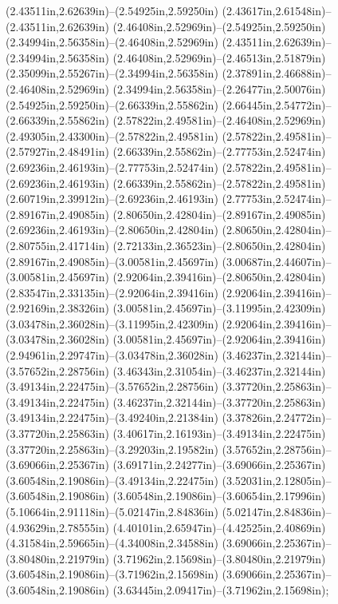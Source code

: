 (2.43511in,2.62639in)--(2.54925in,2.59250in) (2.43617in,2.61548in)--(2.43511in,2.62639in) (2.46408in,2.52969in)--(2.54925in,2.59250in) (2.34994in,2.56358in)--(2.46408in,2.52969in) (2.43511in,2.62639in)--(2.34994in,2.56358in) (2.46408in,2.52969in)--(2.46513in,2.51879in) (2.35099in,2.55267in)--(2.34994in,2.56358in) (2.37891in,2.46688in)--(2.46408in,2.52969in) (2.34994in,2.56358in)--(2.26477in,2.50076in) (2.54925in,2.59250in)--(2.66339in,2.55862in) (2.66445in,2.54772in)--(2.66339in,2.55862in) (2.57822in,2.49581in)--(2.46408in,2.52969in) (2.49305in,2.43300in)--(2.57822in,2.49581in) (2.57822in,2.49581in)--(2.57927in,2.48491in) (2.66339in,2.55862in)--(2.77753in,2.52474in) (2.69236in,2.46193in)--(2.77753in,2.52474in) (2.57822in,2.49581in)--(2.69236in,2.46193in) (2.66339in,2.55862in)--(2.57822in,2.49581in) (2.60719in,2.39912in)--(2.69236in,2.46193in) (2.77753in,2.52474in)--(2.89167in,2.49085in) (2.80650in,2.42804in)--(2.89167in,2.49085in) (2.69236in,2.46193in)--(2.80650in,2.42804in) (2.80650in,2.42804in)--(2.80755in,2.41714in) (2.72133in,2.36523in)--(2.80650in,2.42804in) (2.89167in,2.49085in)--(3.00581in,2.45697in) (3.00687in,2.44607in)--(3.00581in,2.45697in) (2.92064in,2.39416in)--(2.80650in,2.42804in) (2.83547in,2.33135in)--(2.92064in,2.39416in) (2.92064in,2.39416in)--(2.92169in,2.38326in) (3.00581in,2.45697in)--(3.11995in,2.42309in) (3.03478in,2.36028in)--(3.11995in,2.42309in) (2.92064in,2.39416in)--(3.03478in,2.36028in) (3.00581in,2.45697in)--(2.92064in,2.39416in) (2.94961in,2.29747in)--(3.03478in,2.36028in) (3.46237in,2.32144in)--(3.57652in,2.28756in) (3.46343in,2.31054in)--(3.46237in,2.32144in) (3.49134in,2.22475in)--(3.57652in,2.28756in) (3.37720in,2.25863in)--(3.49134in,2.22475in) (3.46237in,2.32144in)--(3.37720in,2.25863in) (3.49134in,2.22475in)--(3.49240in,2.21384in) (3.37826in,2.24772in)--(3.37720in,2.25863in) (3.40617in,2.16193in)--(3.49134in,2.22475in) (3.37720in,2.25863in)--(3.29203in,2.19582in) (3.57652in,2.28756in)--(3.69066in,2.25367in) (3.69171in,2.24277in)--(3.69066in,2.25367in) (3.60548in,2.19086in)--(3.49134in,2.22475in) (3.52031in,2.12805in)--(3.60548in,2.19086in) (3.60548in,2.19086in)--(3.60654in,2.17996in) (5.10664in,2.91118in)--(5.02147in,2.84836in) (5.02147in,2.84836in)--(4.93629in,2.78555in) (4.40101in,2.65947in)--(4.42525in,2.40869in) (4.31584in,2.59665in)--(4.34008in,2.34588in) (3.69066in,2.25367in)--(3.80480in,2.21979in) (3.71962in,2.15698in)--(3.80480in,2.21979in) (3.60548in,2.19086in)--(3.71962in,2.15698in) (3.69066in,2.25367in)--(3.60548in,2.19086in) (3.63445in,2.09417in)--(3.71962in,2.15698in);
